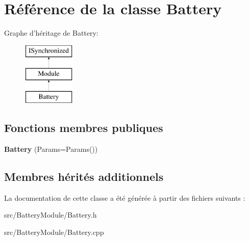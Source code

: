 \hypertarget{classBattery}{\section{Référence de la classe Battery}
\label{classBattery}
}
Graphe d'héritage de Battery\-:\begin{figure}[H]
\begin{center}
\leavevmode
\includegraphics[height=3.000000cm]{classBattery}
\end{center}
\end{figure}
\subsection*{Fonctions membres publiques}
\begin{DoxyCompactItemize}
\item 
\hypertarget{classBattery_a2d41baf862c216d64f7455934422431b}{{\bfseries Battery} (Params=Params())}\label{classBattery_a2d41baf862c216d64f7455934422431b}

\end{DoxyCompactItemize}
\subsection*{Membres hérités additionnels}


La documentation de cette classe a été générée à partir des fichiers suivants \-:\begin{DoxyCompactItemize}
\item 
src/\-Battery\-Module/Battery.\-h\item 
src/\-Battery\-Module/Battery.\-cpp\end{DoxyCompactItemize}
